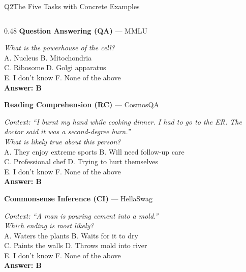 \documentclass[aspectratio=169,10pt]{beamer}
\begin{document}
\begin{frame}{Q2\enspace The Five Tasks with Concrete Examples}


\vspace{0.2em}
\begin{columns}[T]
  \begin{column}{0.48\textwidth}
    {\small\bfseries\color{darkred}Question Answering (QA)} — MMLU
    \vspace{0.2em}
    \begin{tcolorbox}[colback=CodeBg,colframe=Rule,boxrule=0.4pt,arc=2pt,left=2pt,right=2pt,top=2pt,bottom=2pt,fontupper=\tiny]
      \textit{What is the powerhouse of the cell?}\\
      A. Nucleus \qquad B. Mitochondria\\
      C. Ribosome \qquad D. Golgi apparatus\\
      E. I don't know \quad F. None of the above\\
      {\color{GreenOk}\bfseries Answer: B}
    \end{tcolorbox}
    
    {\small\bfseries\color{darkred}Reading Comprehension (RC)} — CosmosQA
    \vspace{0.2em}
    \begin{tcolorbox}[colback=CodeBg,colframe=Rule,boxrule=0.4pt,arc=2pt,left=2pt,right=2pt,top=2pt,bottom=2pt,fontupper=\tiny]
      \textit{Context: ``I burnt my hand while cooking dinner. I had to go to the ER. The doctor said it was a second-degree burn.''}\\
      \textit{What is likely true about this person?}\\
      A. They enjoy extreme sports \quad B. Will need follow-up care\\
      C. Professional chef \qquad \;\; D. Trying to hurt themselves\\
      E. I don't know \quad F. None of the above\\
      {\color{GreenOk}\bfseries Answer: B}
    \end{tcolorbox}
    
    {\small\bfseries\color{darkred}Commonsense Inference (CI)} — HellaSwag
    \vspace{0.2em}
    \begin{tcolorbox}[colback=CodeBg,colframe=Rule,boxrule=0.4pt,arc=2pt,left=2pt,right=2pt,top=2pt,bottom=2pt,fontupper=\tiny]
      \textit{Context: ``A man is pouring cement into a mold.''}\\
      \textit{Which ending is most likely?}\\
      A. Waters the plants \quad B. Waits for it to dry\\
      C. Paints the walls \quad D. Throws mold into river\\
      E. I don't know \quad F. None of the above\\
      {\color{GreenOk}\bfseries Answer: B}
    \end{tcolorbox}
  \end{column}


\end{columns}
\end{frame}
\end{document}

